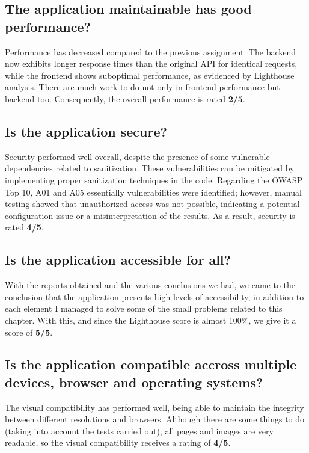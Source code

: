 \documentclass[a4paper,11pt,openright,BCOR=15mm]{scrbook}
\begin{document}
	\subsection{The application maintainable has good performance?}			
	Performance has decreased compared to the previous assignment. The backend now exhibits longer response times than the original API for identical requests, while the frontend shows suboptimal performance, as evidenced by Lighthouse analysis. There are much work to do not only in frontend performance but backend too. Consequently, the overall performance is rated \textbf{2/5}.
	
	\subsection{Is the application secure?}			
	Security performed well overall, despite the presence of some vulnerable dependencies related to sanitization. These vulnerabilities can be mitigated by implementing proper sanitization techniques in the code. Regarding the OWASP Top 10, A01 and A05 essentially vulnerabilities were identified; however, manual testing showed that unauthorized access was not possible, indicating a potential configuration issue or a misinterpretation of the results. As a result, security is rated \textbf{4/5}.
	
	\subsection{Is the application accessible for all?}		
	With the reports obtained and the various conclusions we had, we came to the conclusion that the application presents high levels of accessibility, in addition to each element I managed to solve some of the small problems related to this chapter. With this, and since the Lighthouse score is almost 100\%, we give it a score of \textbf{5/5}.
	
	\subsection{Is the application compatible accross multiple devices, browser and operating systems?}
	The visual compatibility has performed well, being able to maintain the
	integrity between different resolutions and browsers. Although there are some things to do (taking into account the tests carried out), all pages and images are very readable, so the visual compatibility
	receives a rating of \textbf{4/5}.
			
\end{document}
